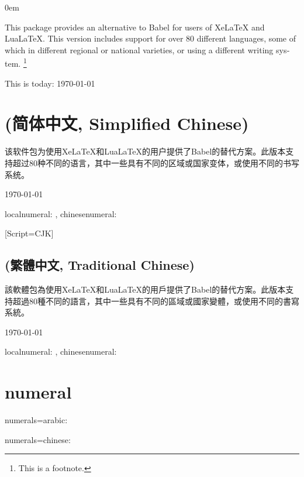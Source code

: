\documentclass{article}
\begin{document}
\parindent0em

\begin{center}
  \abstractname
\end{center}
\begin{english}
  This package provides an alternative to Babel for users of XeLaTeX
  and LuaLaTeX. This version includes support for over 80 different
  languages, some of which in different regional or national
  varieties, or using a different writing system.
  \footnote{%
  This is a footnote.}

  This is today: \today
\end{english}

\section{(简体中文, Simplified Chinese)}

该软件包为使用XeLaTeX和LuaLaTeX的用户提供了Babel的替代方案。此版本支持超过80种不同的语言，其中一些具有不同的区域或国家变体，或使用不同的书写系统。

\today

localnumeral: , chinesenumeral: 

\renewfontfamily{}[Script=CJK]
\begin{chinese}[variant=traditional,numerals=chinese]

  \section{(繁體中文, Traditional Chinese)}

  該軟體包為使用XeLaTeX和LuaLaTeX的用戶提供了Babel的替代方案。此版本支持超過80種不同的語言，其中一些具有不同的區域或國家變體，或使用不同的書寫系統。

  \today

  localnumeral: , chinesenumeral: 

\end{chinese}

\section{numeral}
\begin{english}

  numerals=arabic: 

  numerals=chinese:

\end{english}
\end{document}
